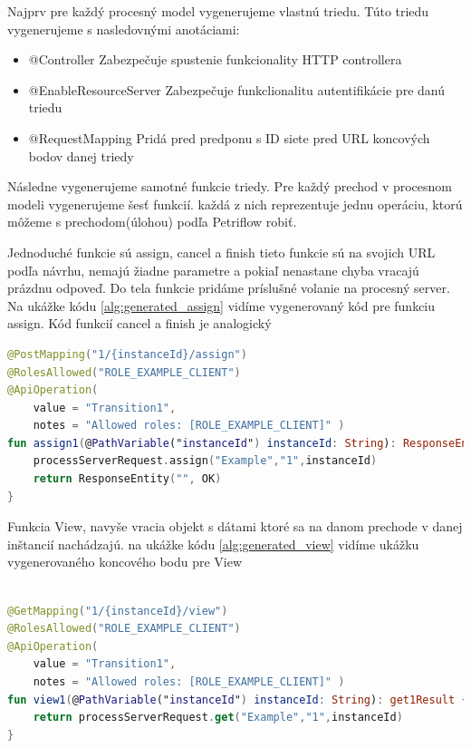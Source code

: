 Najprv pre každý procesný model vygenerujeme vlastnú triedu. Túto triedu vygenerujeme s nasledovnými anotáciami: 

\begin{itemize} 
	\item @Controller Zabezpečuje spustenie funkcionality HTTP controllera  
	\item @EnableResourceServer Zabezpečuje funkclionalitu autentifikácie pre danú triedu 
	\item @RequestMapping Pridá pred predponu s ID siete pred URL koncových bodov danej triedy 
\end{itemize} 

Následne vygenerujeme samotné funkcie triedy. Pre každý prechod v procesnom modeli vygenerujeme šesť funkcií. každá z nich reprezentuje jednu operáciu, ktorú môžeme s prechodom(úlohou) podľa Petriflow robiť.  

Jednoduché funkcie sú assign, cancel a finish tieto funkcie sú na svojich URL podľa návrhu, nemajú žiadne parametre a pokiaľ nenastane chyba vracajú prázdnu odpoveď. Do tela funkcie pridáme príslušné volanie na procesný server. Na ukážke kódu \ref{alg:generated_assign} vidíme vygenerovaný kód pre funkciu assign. Kód funkcií cancel a finish je analogický  



\begin{lstlisting}[float, caption={Príklad vygenerovanej funkcie},label={alg:generated_assign},language=Kotlin] 
@PostMapping("1/{instanceId}/assign") 
@RolesAllowed("ROLE_EXAMPLE_CLIENT") 
@ApiOperation( 
	value = "Transition1", 
	notes = "Allowed roles: [ROLE_EXAMPLE_CLIENT]" ) 
fun assign1(@PathVariable("instanceId") instanceId: String): ResponseEntity<String> { 
	processServerRequest.assign("Example","1",instanceId) 
	return ResponseEntity("", OK) 
} 
\end{lstlisting} 

Funkcia View, navyše vracia objekt s dátami ktoré sa na danom prechode v danej inštancií nachádzajú. na ukážke kódu \ref{alg:generated_view} vidíme ukážku vygenerovaného koncového bodu pre View 


\begin{lstlisting}[float, caption={Príklad vygenerovanej funkcie},label={alg:generated_view},language=Kotlin] 

@GetMapping("1/{instanceId}/view") 
@RolesAllowed("ROLE_EXAMPLE_CLIENT") 
@ApiOperation( 
	value = "Transition1", 
	notes = "Allowed roles: [ROLE_EXAMPLE_CLIENT]" ) 
fun view1(@PathVariable("instanceId") instanceId: String): get1Result { 
	return processServerRequest.get("Example","1",instanceId) 
} 
\end{lstlisting} 



